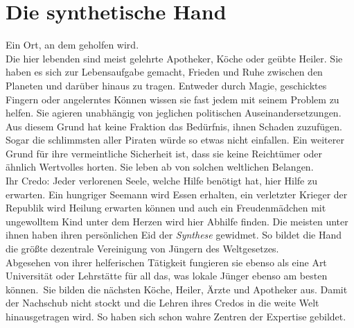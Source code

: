 \documentclass{book}
\begin{document}
\section{Die synthetische Hand}
Ein Ort, an dem geholfen wird.\\
Die hier lebenden sind meist gelehrte Apotheker, Köche oder geübte Heiler. Sie haben es sich zur Lebensaufgabe gemacht, Frieden und Ruhe zwischen den Planeten und darüber hinaus zu tragen. Entweder durch Magie, geschicktes Fingern oder angelerntes Können wissen sie fast jedem mit seinem Problem zu helfen. Sie agieren unabhängig von jeglichen politischen Auseinandersetzungen. Aus diesem Grund hat keine Fraktion das Bedürfnis, ihnen Schaden zuzufügen. Sogar die schlimmsten aller Piraten würde so etwas nicht einfallen. Ein weiterer Grund für ihre vermeintliche Sicherheit ist, dass sie keine Reichtümer oder ähnlich Wertvolles horten. Sie leben ab von solchen weltlichen Belangen.\\
Ihr Credo: Jeder verlorenen Seele, welche Hilfe benötigt hat, hier Hilfe zu erwarten. Ein hungriger Seemann wird Essen erhalten, ein verletzter Krieger der Republik wird Heilung erwarten können und auch ein Freudenmädchen mit ungewolltem Kind unter dem Herzen wird hier Abhilfe finden. Die meisten unter ihnen haben ihren persönlichen Eid der \emph{Synthese} gewidmet. So bildet die Hand die größte dezentrale Vereinigung von Jüngern des Weltgesetzes.\\
Abgesehen von ihrer helferischen Tätigkeit fungieren sie ebenso als eine Art Universität oder Lehrstätte für all das, was lokale Jünger ebenso am besten können. Sie bilden die nächsten Köche, Heiler, Ärzte und Apotheker aus. Damit der Nachschub nicht stockt und die Lehren ihres Credos in die weite Welt hinausgetragen wird. So haben sich schon wahre Zentren der Expertise gebildet.\\
\end{document}
